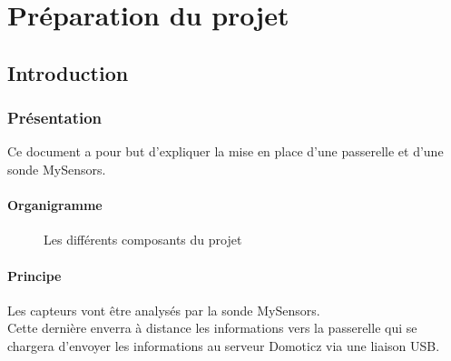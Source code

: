 \part{Préparation du projet}

\chapter{Introduction}

\section{Présentation}

Ce document a pour but d'expliquer la mise en place d'une passerelle et d'une sonde MySensors.

\subsection{Organigramme}

\begin{figure}[h]
  \centering
{} 
\caption{Les différents composants du projet}
\end{figure}

  \subsection{Principe}

  Les capteurs vont être analysés par la sonde MySensors.\\
  Cette dernière enverra à distance les informations vers la passerelle qui se chargera d'envoyer les informations au serveur Domoticz via une liaison USB.\\


